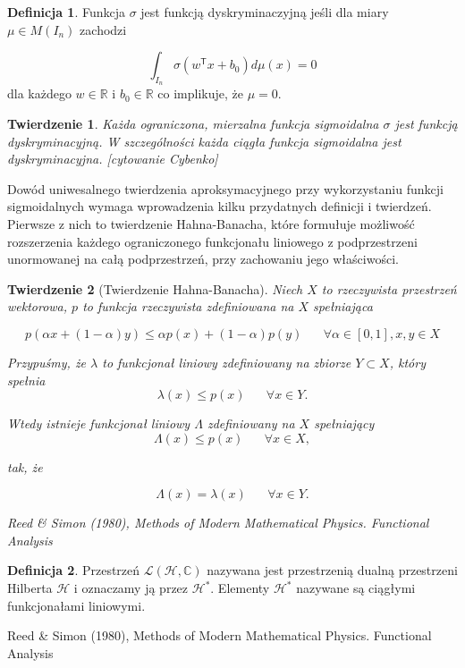 \documentclass[11pt]{book}
\newtheorem{theorem}{Twierdzenie}[section]
\theoremstyle{definition}
\newtheorem{definition}{Definicja}[section]
\begin{document}
\begin{definition}
	Funkcja $\sigma$ jest funkcją dyskryminaczyjną jeśli dla miary $\mu \in M(I_n)$ zachodzi 
	
	\begin{equation}
	\int_{I_n} \sigma \left( w^\mathsf{T}x + b_0 \right) d\mu(x) = 0
	\end{equation}
	dla każdego $w\in \mathbb{R}$ i $b_0 \in \mathbb{R}$ co implikuje, że $\mu = 0$.
	
\end{definition}


\begin{theorem}
	Każda ograniczona, mierzalna funkcja sigmoidalna $\sigma$ jest funkcją dyskryminacyjną. W szczególności każda ciągła funkcja sigmoidalna jest dyskryminacyjna.
	[cytowanie Cybenko]
\end{theorem}

Dowód uniwesalnego twierdzenia aproksymacyjnego przy wykorzystaniu funkcji sigmoidalnych wymaga wprowadzenia kilku przydatnych definicji i twierdzeń. Pierwsze z nich to twierdzenie Hahna-Banacha, które formułuje możliwość rozszerzenia każdego ograniczonego funkcjonału liniowego z podprzestrzeni unormowanej na całą podprzestrzeń, przy zachowaniu jego właściwości.


\begin{theorem}[Twierdzenie Hahna-Banacha]
	
	
	Niech $X$ to rzeczywista przestrzeń wektorowa, $p$ to funkcja rzeczywista zdefiniowana na $X$ spełniająca
	
	$$	p \left(\alpha x + (1-\alpha) y \right) \leq \alpha p(x)  + (1 - \alpha)p(y) \;\;\;\;\;\; \forall \alpha \in \left[0,1\right], x, y \in X$$
	
	
	Przypuśmy, że $\lambda$ to funkcjonał liniowy zdefiniowany na zbiorze $Y\subset X $, który spełnia
	$$\lambda(x) \leq p(x) \;\;\;\;\;\; \forall x \in Y.$$
	
	
	Wtedy istnieje funkcjonał liniowy $\Lambda$ zdefiniowany na $X$ spełniający
	$$\Lambda(x) \leq p(x) \;\;\;\;\;\; \forall x \in X,$$
	
	tak, że
	
	$$\Lambda(x) = \lambda(x) \;\;\;\;\;\; \forall x \in Y.$$
	
	
	Reed \& Simon (1980), Methods of Modern Mathematical Physics. Functional Analysis
\end{theorem}


\begin{definition}	
	
	Przestrzeń $\mathcal{L}\left(\mathcal{H}, \mathbb{C}\right)$ nazywana jest przestrzenią dualną przestrzeni Hilberta $\mathcal{H}$ i oznaczamy ją przez $\mathcal{H^*}$. Elementy $\mathcal{H^*}$ nazywane są ciągłymi funkcjonałami liniowymi.
	
	
	Reed \& Simon (1980), Methods of Modern Mathematical Physics. Functional Analysis
	
\end{definition}	
\end{document}
